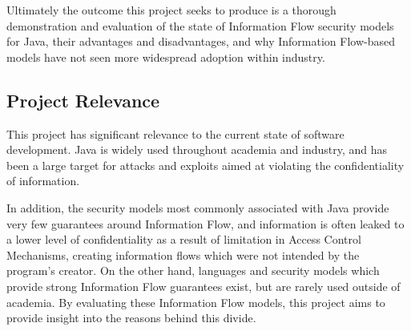 Ultimately the outcome this project seeks to produce is a thorough demonstration and evaluation of the state of Information Flow security models for Java, their advantages and disadvantages, and why Information Flow-based models have not seen more widespread adoption within industry.

\subsection{Project Relevance}

This project has significant relevance to the current state of software development. Java is widely used throughout academia and industry, and has been a large target for attacks and exploits aimed at violating the confidentiality of information.

In addition, the security models most commonly associated with Java provide very few guarantees around Information Flow, and  information is often leaked to a lower level of confidentiality as a result of limitation in Access Control Mechanisms, creating information flows which were not intended by the program's creator. On the other hand, languages and security models which provide strong Information Flow guarantees exist, but are rarely used outside of academia. By evaluating these Information Flow models, this project aims to provide insight into the reasons behind this divide.